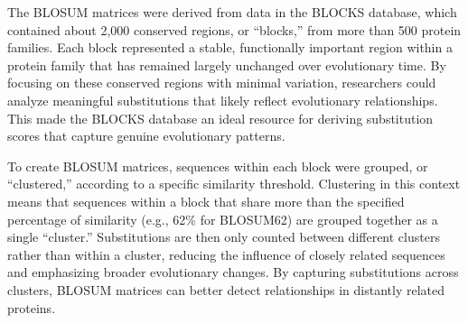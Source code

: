 The BLOSUM matrices were derived from data in the BLOCKS database, which contained about 2,000 conserved regions, or ``blocks,'' from more than 500 protein families.
Each block represented a stable, functionally important region within a protein family that has remained largely unchanged over evolutionary time. By focusing on these conserved regions with minimal variation, researchers could analyze meaningful substitutions that likely reflect evolutionary relationships. This made the BLOCKS database an ideal resource for deriving substitution scores that capture genuine evolutionary patterns.

To create BLOSUM matrices,
sequences within each block were grouped, or ``clustered,'' according to a specific similarity threshold. Clustering in this context means that sequences within a block that share more than the specified percentage of similarity (e.g., 62\% for BLOSUM62) are grouped together as a single ``cluster.'' Substitutions are then only counted between different clusters rather than within a cluster, reducing the influence of closely related sequences and emphasizing broader evolutionary changes. By capturing substitutions across clusters, BLOSUM matrices can better detect relationships in distantly related proteins.

